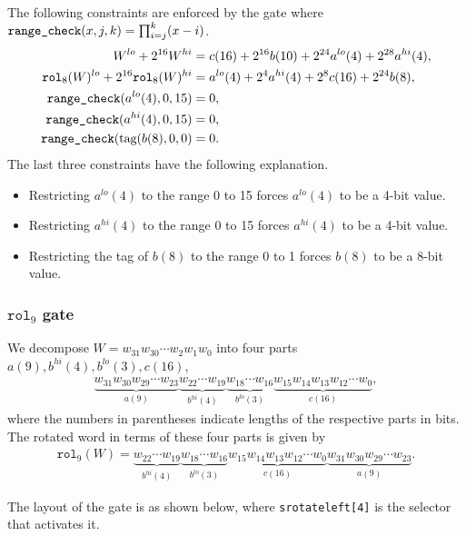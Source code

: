 \documentclass[10pt]{article}
\begin{document}
The following constraints are enforced by the gate where $\texttt{range\textunderscore check}(x, j, k) = \prod_{i=j}^k (x-i)$.
\begin{align*}
  W^{lo} + 2^{16} W^{hi} & = c(16) + 2^{16} b(10) + 2^{24} a^{lo}(4) + 2^{28} a^{hi}(4),\\
  \texttt{rol}_8(W)^{lo} + 2^{16} \texttt{rol}_8(W)^{hi} & = a^{lo}(4) + 2^{4} a^{hi}(4) + 2^8 c(16) + 2^{24} b(8),\\
  \texttt{range\textunderscore check}(a^{lo}(4), 0, 15) & = 0,\\
  \texttt{range\textunderscore check}(a^{hi}(4), 0, 15) & = 0,\\
  \texttt{range\textunderscore check}(\text{tag}(b(8), 0, 0) & = 0.
\end{align*}
The last three constraints have the following explanation.
\begin{itemize}
\item Restricting $a^{lo}(4)$ to the range 0 to 15 forces $a^{lo}(4)$ to be a 4-bit value.
\item Restricting $a^{hi}(4)$ to the range 0 to 15 forces $a^{hi}(4)$ to be a 4-bit value.
\item Restricting the tag of $b(8)$ to the range 0 to 1 forces $b(8)$ to be a 8-bit value.
\end{itemize}

\subsubsection{$\texttt{rol}_9$ gate}%
\label{sec:rol_9_gate}
We decompose $W = w_{31}w_{30}\cdots w_2w_1w_0$ into four parts $a(9), b^{hi}(4), b^{lo}(3), c(16)$,
\begin{align*}
  \underbrace{w_{31}w_{30}w_{29}\cdots w_{23}}_{a(9)} \underbrace{w_{22}\cdots w_{19}}_{b^{hi}(4)}
  \underbrace{w_{18}\cdots w_{16}}_{b^{lo}(3)} \underbrace{w_{15}w_{14}w_{13}w_{12}\cdots w_{0}}_{c(16)},
\end{align*}
where the numbers in parentheses indicate lengths of the respective parts in bits. The rotated word in terms of these four parts is given by
\begin{align*}
  \texttt{rol}_9(W) = 
  \underbrace{w_{22}\cdots w_{19}}_{b^{hi}(4)} \underbrace{w_{18}\cdots w_{16}}_{b^{lo}(3)}
  \underbrace{w_{15}w_{14}w_{13}w_{12}\cdots w_{0}}_{c(16)}\underbrace{w_{31}w_{30}w_{29}\cdots w_{23}}_{a(9)}.
\end{align*}

The layout of the gate is as shown below, where \texttt{s\textunderscore rotate\textunderscore left[4]} is the selector that activates it.
\end{document}
